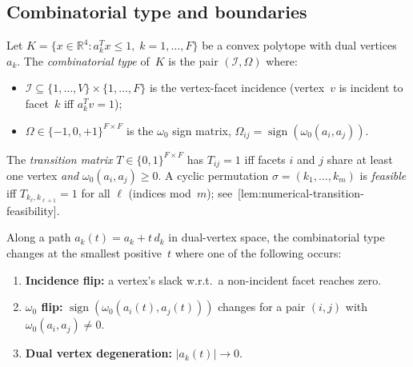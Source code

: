 %
%

\subsection{Combinatorial type and boundaries}
\label{sec:combinatorial-boundaries}

\begin{definition}\label{def:combinatorial-type}
Let $K = \{x \in \mathbb{R}^4 : a_k^T x \le 1,\; k = 1, \ldots, F\}$ be a
convex polytope with dual vertices $a_k$.
The \emph{combinatorial type} of~$K$ is the pair $(\mathcal{I}, \Omega)$ where:
\begin{itemize}
  \item $\mathcal{I} \subseteq \{1, \ldots, V\} \times \{1, \ldots, F\}$ is the
    vertex-facet incidence (vertex~$v$ is incident to facet~$k$ iff $a_k^T v = 1$);
  \item $\Omega \in \{-1, 0, +1\}^{F \times F}$ is the $\omega_0$ sign matrix,
    $\Omega_{ij} = \operatorname{sign}(\omega_0(a_i, a_j))$.
\end{itemize}
\end{definition}

\begin{definition}\label{def:transition-matrix}
The \emph{transition matrix} $T \in \{0,1\}^{F \times F}$ has $T_{ij} = 1$ iff
facets $i$ and $j$ share at least one vertex \emph{and} $\omega_0(a_i, a_j) \ge 0$.
A cyclic permutation $\sigma = (k_1, \ldots, k_m)$ is \emph{feasible} iff
$T_{k_\ell, k_{\ell+1}} = 1$ for all $\ell$ (indices mod~$m$);
see~[lem:numerical-transition-feasibility].
\end{definition}

\begin{definition}\label{def:boundary-events}
Along a path $a_k(t) = a_k + t \, d_k$ in dual-vertex space, the combinatorial
type changes at the smallest positive~$t$ where one of the following occurs:
\begin{enumerate}
  \item \textbf{Incidence flip:} a vertex's slack w.r.t.\ a non-incident facet
    reaches zero.
  \item \textbf{$\omega_0$ flip:} $\operatorname{sign}(\omega_0(a_i(t), a_j(t)))$
    changes for a pair $(i,j)$ with $\omega_0(a_i, a_j) \ne 0$.
  \item \textbf{Dual vertex degeneration:} $|a_k(t)| \to 0$.
\end{enumerate}
\end{definition}

